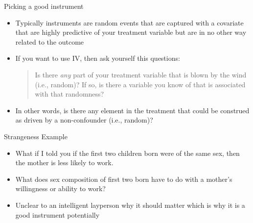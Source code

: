 \documentclass{beamer}
\begin{document}
\begin{frame}{Picking a good instrument}

	\begin{itemize}
	\item Typically instruments are random events that are captured with a covariate that are highly predictive of your treatment variable but are in no other way related to the outcome
	\item If you want to use IV, then ask yourself this questions: 
		\begin{quote}
		Is there \emph{any} part of your treatment variable that is blown by the wind (i.e., random)? If so, is there a variable you know of that is associated with that randomness?
		\end{quote}
		\item In other words, is there any element in the treatment that could be construed as driven by a non-confounder (i.e., random)?  
	\end{itemize}
\end{frame}



\begin{frame}{Strangeness Example}

		\begin{itemize}
		\item What if I told you if the first two children born were of the same sex, then the mother is less likely to work.
		\item What does sex composition of first two born have to do with a mother's willingness or ability to work? \pause
		\item Unclear to an intelligent layperson why it should matter \pause which is why it is a good instrument potentially
		\end{itemize}

\end{frame}
\end{document}
